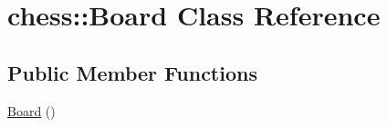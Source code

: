 \hypertarget{classchess_1_1Board}{\section{chess\-:\-:Board Class Reference}
\label{classchess_1_1Board}
}
\subsection*{Public Member Functions}
\begin{DoxyCompactItemize}
\item 
\hypertarget{classchess_1_1Board_aa18fed833d071775910da2cebd65ccef}{\hyperlink{classchess_1_1Board_aa18fed833d071775910da2cebd65ccef}{Board} ()}\label{classchess_1_1Board_aa18fed833d071775910da2cebd65ccef}


\end{DoxyCompactItemize}
